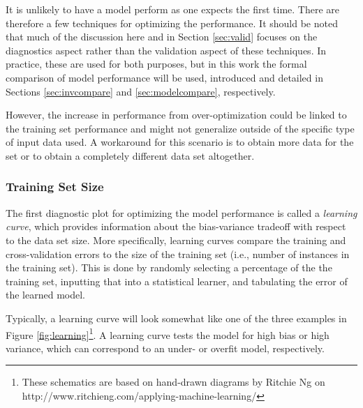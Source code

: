 It is unlikely to have a model perform as one expects the first time. There are
therefore a few techniques for optimizing the performance. It should be noted
that much of the discussion here and in Section \ref{sec:valid} focuses on
the diagnostics aspect rather than the validation aspect of these techniques.
In practice, these are used for both purposes, but in this work the formal
comparison of model performance will be used, introduced and detailed in
Sections \ref{sec:invcompare} and \ref{sec:modelcompare}, respectively. 

However, the increase in performance from over-optimization could be linked to
the training set performance and might not generalize outside of the specific
type of input data used.  A workaround for this scenario is to obtain more data
for the set or to obtain a completely different data set altogether. 

\subsubsection{Training Set Size}

The first diagnostic plot for optimizing the model performance is called a
\textit{learning curve}, which provides information about the bias-variance
tradeoff with respect to the data set size. More specifically, learning curves
compare the training and cross-validation errors to the size of the training
set (i.e., number of instances in the training set). This is done by randomly
selecting a percentage of the the training set, inputting that into a
statistical learner, and tabulating the error of the learned model. 

Typically, a learning curve will look somewhat like one of the three examples
in Figure \ref{fig:learning}\footnote{These schematics are based on hand-drawn
diagrams by Ritchie Ng on http://www.ritchieng.com/applying-machine-learning/}.
A learning curve tests the model for high bias or high variance, which can
correspond to an under- or overfit model, respectively. 

